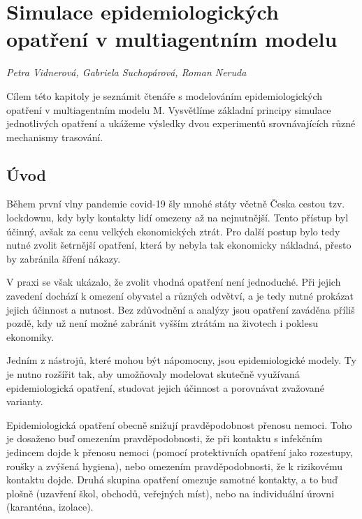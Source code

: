 
\chapter[Simulace v multiagentním modelu]{Simulace epidemiologických opatření v multiagentním modelu}
\label{Evaluace_politik}

\textit{Petra Vidnerová, Gabriela Suchopárová, Roman Neruda}
\vspace{15mm}

Cílem této kapitoly je seznámit čtenáře s modelováním
epidemiologických opatření v multiagentním modelu M. Vysvětlíme
základní principy simulace jednotlivých opatření a ukážeme výsledky
dvou experimentů srovnávajících různé mechanismy trasování.


\section*{Úvod}

Během první vlny pandemie covid-19 šly mnohé státy včetně Česka
cestou tzv. lockdownu, kdy byly kontakty lidí omezeny až na
nejnutnější. Tento přístup byl účinný, avšak za cenu velkých
ekonomických ztrát. Pro další postup bylo tedy nutné zvolit šetrnější
opatření, která by nebyla tak ekonomicky nákladná, přesto by zabránila
šíření nákazy.

V praxi se však ukázalo, že zvolit vhodná opatření není
jednoduché. Při jejich zavedení dochází k omezení obyvatel a různých
odvětví, a je tedy nutné prokázat jejich účinnost a nutnost. Bez
zdůvodnění a analýzy jsou opatření zaváděna příliš pozdě, kdy už není
možné zabránit vyšším ztrátám na životech i poklesu ekonomiky.

Jedním z nástrojů, které mohou být nápomocny, jsou epidemiologické
modely. Ty je nutno rozšířit tak, aby umožňovaly modelovat skutečně
využívaná epidemiologická opatření, studovat jejich účinnost a
porovnávat zvažované varianty.

Epidemiologická opatření obecně snižují pravděpodobnost přenosu nemoci. Toho
je dosaženo buď omezením pravděpodobnosti, že při kontaktu s infekčním jedincem
dojde k přenosu nemoci (pomocí protektivních opatření jako rozestupy, roušky
a zvýšená hygiena), nebo omezením pravděpodobnosti, že k rizikovému kontaktu
dojde. Druhá skupina opatření omezuje samotné kontakty, a to buď plošně
(uzavření škol, obchodů, veřejných míst), nebo na individuální úrovni
(karanténa, izolace).




